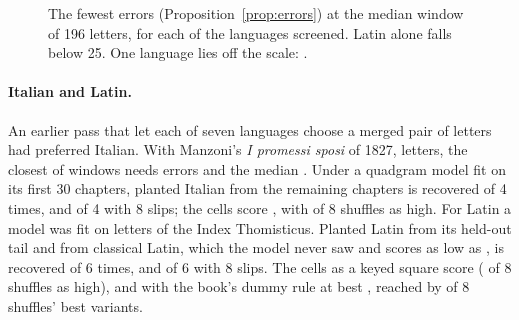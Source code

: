 \documentclass[11pt]{article}
\theoremstyle{definition}
\begin{document}
\begin{table}[t]
\centering
\caption{The twelve treebanks closest to the cells' letter counts, of \allLanguages{} screened. ``Fewest'' and ``Median'' are the fewest errors (Proposition~\ref{prop:errors}) at the closest and at the median window of 196 letters; ``Within 8 per million'' is the rate of windows needing 8 or fewer. Windows are taken every few letters, at most 250,000 a treebank.}
\label{tab:screen}
\small

\end{table}

\begin{figure}[t]
\centering

\caption{The fewest errors (Proposition~\ref{prop:errors}) at the median window of 196 letters, for each of the \allLanguages{} languages screened. Latin alone falls below 25. One language lies off the scale: \screenOutliers{}.}
\label{fig:screen}
\end{figure}

\paragraph{Italian and Latin.} An earlier pass that let each of seven languages choose a merged pair of letters had preferred Italian. With Manzoni's \emph{I promessi sposi} of 1827, \itLetters{} letters, the closest of \itWindows{} windows needs \itFewest{} errors and the median \itMedian{}. Under a quadgram model fit on its first 30 chapters, planted Italian from the remaining chapters is recovered \itRecovered{} of 4 times, and \itErrRecovered{} of 4 with 8 slips; the cells score \itCells{}, with \itAsHigh{} of 8 shuffles as high. For Latin a model was fit on \laTrainLetters{} letters of the Index Thomisticus. Planted Latin from its held-out tail and from classical Latin, which the model never saw and scores as low as \laClassicalLow{}, is recovered \laRecovered{} of 6 times, and \laErrRecovered{} of 6 with 8 slips. The cells as a keyed square score \laSquare{} (\laSquareAsHigh{} of 8 shuffles as high), and with the book's dummy rule at best \laBest{}, reached by \laBestAsHigh{} of 8 shuffles' best variants.
\end{document}
